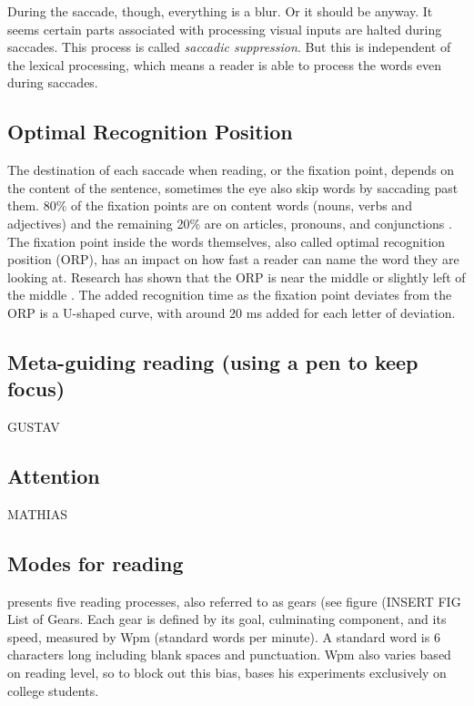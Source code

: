 During the saccade, though, everything is a blur. Or it should be anyway. It seems certain parts associated with processing visual inputs are halted during saccades. This process is called \textit{saccadic suppression}. But this is independent of the lexical processing, which means a reader is able to process the words even during saccades.

\subsection{Optimal Recognition Position} \label{ORP}
The destination of each saccade when reading, or the fixation point, depends on the content of the sentence, sometimes the eye also skip words by saccading past them. 80\% of the fixation points are on content words (nouns, verbs and adjectives) and the remaining 20\% are on articles, pronouns, and conjunctions \cite{eysenck_cognitive_2010}. The fixation point inside the words themselves, also called optimal recognition position (ORP), has an impact on how fast a reader can name the word they are looking at. Research has shown that the ORP is near the middle or slightly left of the middle \cite{oregan_optimal_1992, nazir_letter_1998, oregan_convenient_1984}. The added recognition time as the fixation point deviates from the ORP is a U-shaped curve, with around 20 ms added for each letter of deviation.


\subsection{Meta-guiding reading (using a pen to keep focus)}
GUSTAV

\subsection{Attention}
MATHIAS

\subsection{Modes for reading}
\cite{carver_reading_1992} presents five reading processes, also referred to as gears (see figure (INSERT FIG List of Gears. Each gear is defined by its goal, culminating component, and its speed, measured by Wpm (standard words per minute). A standard word is 6 characters long including blank spaces and punctuation. Wpm also varies based on reading level, so to block out this bias, \cite{carver_reading_1992} bases his experiments exclusively on college students.

